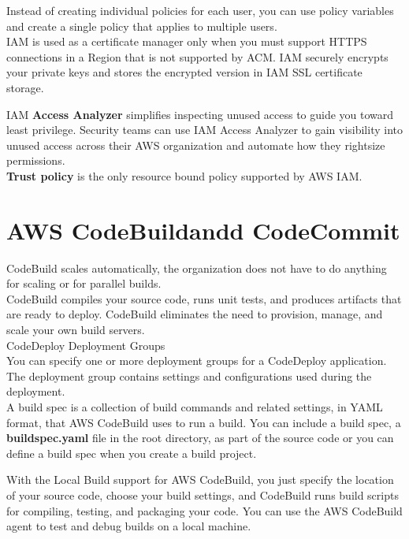 \documentclass[12pt, letterpaper, twoside]{article}
\begin{document}
Instead of creating individual policies for each user, you can use policy variables and create a single policy that applies
to multiple users.\\

IAM is used as a certificate manager only when you must support HTTPS connections in a Region that is not supported by ACM. 
IAM securely encrypts your private keys and stores the encrypted version in IAM SSL certificate storage.

IAM \textbf{Access Analyzer} simplifies inspecting unused access to guide you toward least privilege. 
Security teams can use IAM Access Analyzer to gain visibility into unused access across their AWS organization and automate 
how they rightsize permissions.\\

\textbf{Trust policy} is the only resource bound policy supported by AWS IAM.\\

\section{AWS CodeBuildandd CodeCommit}

CodeBuild scales automatically, the organization does not have to do anything for scaling or for parallel builds.\\
CodeBuild compiles your source code, runs unit tests, and produces artifacts that are ready to deploy. CodeBuild eliminates 
the need to provision, manage, and scale your own build servers.\\ 

CodeDeploy Deployment Groups\\
You can specify one or more deployment groups for a CodeDeploy application. The deployment group contains settings and 
configurations used during the deployment.\\

A build spec is a collection of build commands and related settings, in YAML format, that AWS CodeBuild uses to run a build. 
You can include a build spec, a \textbf{buildspec.yaml} file in the root directory, as part of the source code or you can 
define a build spec when you create a build project.

With the Local Build support for AWS CodeBuild, you just specify the location of your source code, choose your build settings, 
and CodeBuild runs build scripts for compiling, testing, and packaging your code. You can use the AWS CodeBuild agent to test 
and debug builds on a local machine.\\
\end{document}
